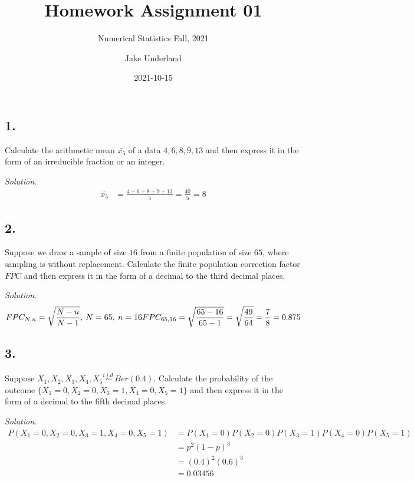 \documentclass[
]{article}
\title{Homework Assignment 01}
\subtitle{Numerical Statistics Fall, 2021}
\author{Jake Underland}
\date{2021-10-15}
\begin{document}
\maketitle

\hypertarget{section}{%
\subsection{1.}\label{section}}

Calculate the arithmetic mean \(\bar{x_5}\) of a data \(4, 6, 8, 9, 13\)
and then express it in the form of an irreducible fraction or an
integer.

\textit{Solution.}\\
\[\begin{aligned}
\bar{x_5} &= \frac{4+ 6+ 8+ 9+ 13}{5} = \frac{40}{5} = 8
\end{aligned}\]

\hypertarget{section-1}{%
\subsection{2.}\label{section-1}}

Suppose we draw a sample of size \(16\) from a finite population of size
\(65\), where sampling is without replacement. Calculate the finite
population correction factor \(FPC\) and then express it in the form of
a decimal to the third decimal places.

\textit{Solution.}\\
\[FPC_{N, n} = \sqrt{\frac{N-n}{N-1}}, \: N = 65, \: n = 16 \\
FPC_{65,16} = \sqrt{\frac{65-16}{65-1}} = \sqrt{\frac{49}{64}} = \frac{7}{8} = 0.875\]

\hypertarget{section-2}{%
\subsection{3.}\label{section-2}}

Suppose \(X_1, X_2, X_3, X_4, X_5 \stackrel{i.i.d.}{\sim} Ber (0.4)\).
Calculate the probability of the outcome
\(\{X_1 =0, X_2 = 0, X_3 = 1, X_4 = 0, X_5 = 1\}\) and then express it
in the form of a decimal to the fifth decimal places.

\textit{Solution.}\\
\[\begin{aligned}
P(X_1 = 0, X_2 = 0, X_3 = 1, X_4 = 0, X_5 = 1)
&= P(X_1 = 0) P(X_2 = 0) P(X_3 = 1) P(X_4 =0) P(X_5 = 1) \\
&= p^2(1-p)^3 \\
&= (0.4)^2(0.6)^3 \\
&= 0.03456
\end{aligned}\]
\end{document}
